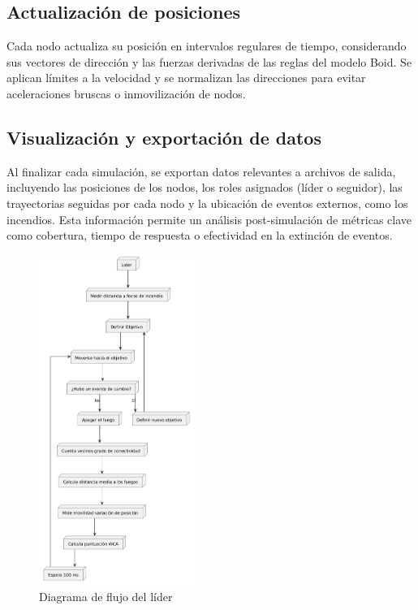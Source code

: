 \documentclass{article}
\begin{document}
\subsection{Actualización de posiciones}

Cada nodo actualiza su posición en intervalos regulares de tiempo, considerando sus vectores de dirección y las fuerzas derivadas de las reglas del modelo Boid. Se aplican límites a la velocidad y se normalizan las direcciones para evitar aceleraciones bruscas o inmovilización de nodos.

\subsection{Visualización y exportación de datos}

Al finalizar cada simulación, se exportan datos relevantes a archivos de salida, incluyendo las posiciones de los nodos, los roles asignados (líder o seguidor), las trayectorias seguidas por cada nodo y la ubicación de eventos externos, como los incendios.
Esta información permite un análisis post-simulación de métricas clave como cobertura, tiempo de respuesta o efectividad en la extinción de eventos.

\begin{figure}[H]
    \centering
    \includegraphics[width=0.45\textwidth]{DiagramaLider.png}
    \caption{Diagrama de flujo del líder}
    \label{fig:diagLead}
\end{figure}
\end{document}
